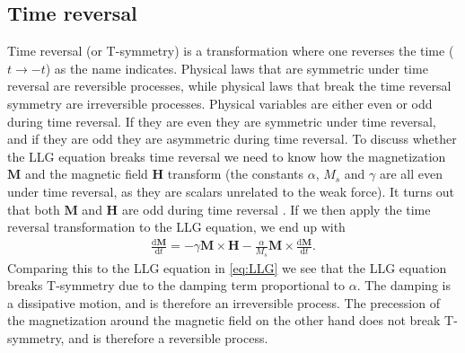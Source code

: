 \subsection{Time reversal}
Time reversal (or T-symmetry) is a transformation where one reverses the time ($t \rightarrow -t$) as the name indicates. Physical laws that are symmetric under time reversal are reversible processes, while physical laws that break the time reversal symmetry are irreversible processes. Physical variables are either even or odd during time reversal. If they are even they are symmetric under time reversal, and if they are odd they are asymmetric during time reversal. To discuss whether the LLG equation breaks time reversal we need to know how the magnetization $\mathbold{M}$ and the magnetic field $\mathbold{H}$ transform (the constants $\alpha$, $M_s$ and $\gamma$ are all even under time reversal, as they are scalars unrelated to the weak force). It turns out that both $\mathbold{M}$ and $\mathbold{H}$ are odd during time reversal \cite{Jackson}. If we then apply the time reversal transformation to the LLG equation, we end up with
\begin{align}
\label{eq:LLG_TR}
\frac{\textrm{d}\mathbold{M}}{\textrm{d}t} = -\gamma\mathbold{M}\times\mathbold{H}-\frac{\alpha}{M_s}\mathbold{M}\times\frac{\textrm{d}\mathbold{M}}{\textrm{d}t}.
\end{align}
Comparing this to the LLG equation in \eqref{eq:LLG} we see that the LLG equation breaks T-symmetry due to the damping term proportional to $\alpha$. The damping is a dissipative motion, and is therefore an irreversible process. The precession of the magnetization around the magnetic field on the other hand does not break T-symmetry, and is therefore a reversible process.

